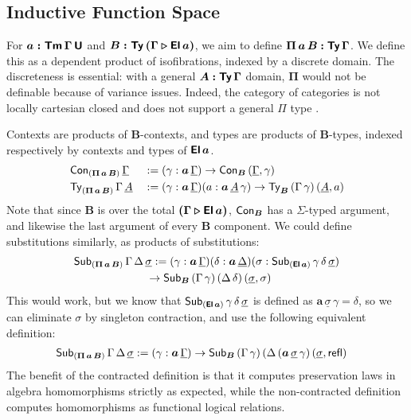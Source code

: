 \documentclass[sigplan,review,anonymous]{acmart}\settopmatter{printfolios=true,printccs=false,printacmref=false}
\newcommand{\ext}{\triangleright}
\newcommand{\bTy}{\boldsymbol{\Ty}}
\newcommand{\bGamma}{\boldsymbol{\Gamma}}
\newcommand{\bA}{\boldsymbol{A}}
\newcommand{\ba}{\boldsymbol{a}}
\newcommand{\bB}{\boldsymbol{B}}
\newcommand{\bEl}{\boldsymbol{\El}}
\newcommand{\bPii}{\boldsymbol{\Pi}}
\newcommand{\ul}[1]{\underline{#1}}
\newcommand{\ulGamma}{\ul{\Gamma}}
\newcommand{\ulDelta}{\ul{\Delta}}
\newcommand{\ulsigma}{\ul{\sigma}}
\newcommand{\ulA}{\ul{A}}
\begin{document}
\subsection{Inductive Function Space}

For $\boldsymbol{a : \mathsf{Tm}\,\Gamma\,\mathsf{U}}$ and $\boldsymbol{B :
  \Ty\,(\Gamma\ext\El\,a)}$, we aim to define $\boldsymbol{\Pi\,a\,B}
\boldsymbol{:} \bTy\,\bGamma$. We define this as a dependent product of
isofibrations, indexed by a discrete domain. The discreteness is essential: with
a general $\bA \boldsymbol{:} \bTy\,\bGamma$ domain, $\bPii$ would not be
definable because of variance issues. Indeed, the category of categories is not
locally cartesian closed and does not support a general $\Pi$ type
\cite{johnstone2002sketches}.

Contexts are products of $\bB$-contexts, and types are products of $\bB$-types,
indexed respectively by contexts and types of $\bEl\,\ba$.
\begin{alignat*}{3}
  & \Con_{(\bPii\,\ba\,\bB)}\,\ulGamma &&:= (\gamma : \ba\,\ulGamma)\ra \Con_{\bB}\,(\ulGamma, \gamma)\\
  & \Ty_{(\bPii\,\ba\,\bB)}\,\Gamma\,\ulA &&:= (\gamma : \ba\,\ulGamma)(a : \ba\,\ulA\,\gamma)\ra \Ty_{\bB}\,(\Gamma\,\gamma)\,(\ulA, a)
\end{alignat*}
Note that since $\bB$ is over the total $\boldsymbol{(\Gamma\ext\El\,a)}$,
$\Con_{\bB}$ has a $\Sigma$-typed argument, and likewise the last argument
of every $\bB$ component.  We could define substitutions similarly, as
products of substitutions:
\begin{alignat*}{3}
  & \Sub_{(\bPii\,\ba\,\bB)}\,\Gamma\,\Delta\,\ulsigma :=
  (\gamma : \ba\,\ulGamma)(\delta : \ba\,\ulDelta)
  (\sigma : \Sub_{(\bEl\,\ba)}\,\gamma\,\delta\,\ulsigma)\\
  &\hspace{6.5em}\ra \Sub_{\bB}\,(\Gamma\,\gamma)\,(\Delta\,\delta)\,(\ulsigma, \sigma)
\end{alignat*}
This would work, but we know that $\Sub_{(\bEl\,\ba)}\,\gamma\,\delta\,\ulsigma$ is defined
as $\ba\,\ulsigma\,\gamma = \delta$, so we can eliminate $\sigma$ by singleton contraction,
and use the following equivalent definition:
\begin{alignat*}{3}
  & \Sub_{(\bPii\,\ba\,\bB)}\,\Gamma\,\Delta\,\ulsigma :=
  (\gamma : \ba\,\ulGamma)\ra\Sub_{\bB}\,(\Gamma\,\gamma)\,(\Delta\,(\ba\,\ulsigma\,\gamma)\,(\ulsigma, \refl)
\end{alignat*}
The benefit of the contracted definition is that it computes preservation laws
in algebra homomorphisms strictly as expected, while the non-contracted
definition computes homomorphisms as functional logical relations.
\end{document}
